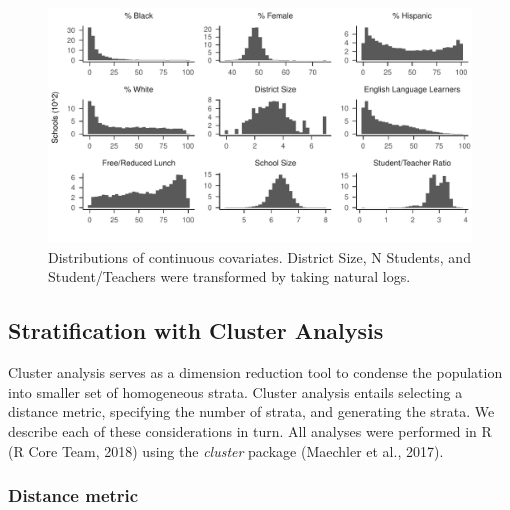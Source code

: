 \documentclass[
  english,
  man,floatsintext]{apa6}
\begin{document}
\begin{figure}
\centering
\includegraphics{6---Paper_files/figure-latex/fig-dist1-1.pdf}
\caption{\label{fig:fig-dist1}Distributions of continuous covariates. District Size, N Students, and Student/Teachers were transformed by taking natural logs.}
\end{figure}

\hypertarget{stratification-with-cluster-analysis}{%
\subsection{Stratification with Cluster Analysis}\label{stratification-with-cluster-analysis}}

Cluster analysis serves as a dimension reduction tool to condense the population into smaller set of homogeneous strata. Cluster analysis entails selecting a distance metric, specifying the number of strata, and generating the strata. We describe each of these considerations in turn. All analyses were performed in R (R Core Team, 2018) using the \emph{cluster} package (Maechler et al., 2017).

\hypertarget{distance-metric}{%
\subsubsection{Distance metric}\label{distance-metric}}
\end{document}
